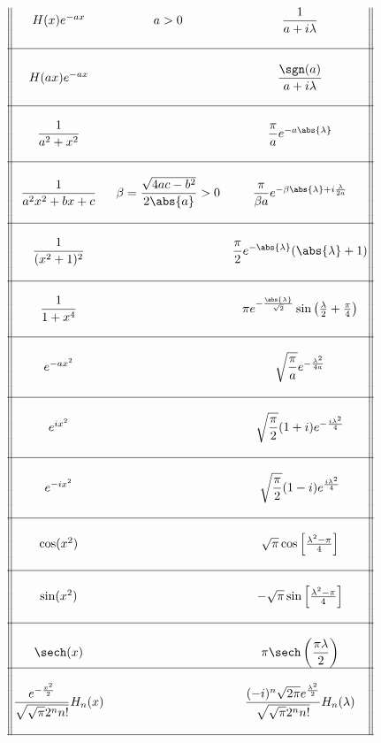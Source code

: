 \documentclass[../mmf.tex]{subfiles}
\begin{document}
\begin{center}
\begin{equation*}
\begin{Vmatrix}
		H(x)e^{-ax} & a>0 & \dfrac{1}{a+i\lambda}\\
		\\\hline\\
		H(ax)e^{-ax} && \dfrac{\sgn(a)}{a+i\lambda} \\
		\\\hline\\
		\dfrac{1}{a^2+x^2} && \dfrac{\pi}{a}e^{-a\abs{\lambda}} \\
		\\\hline\\
		\dfrac{1}{a^2x^2+bx+c} & \beta=\dfrac{\sqrt{4ac-b^2}}{2\abs{a}}>0 & \dfrac{\pi}{\beta a} e^{-\beta\abs{\lambda}+i\frac{\lambda}{2a}}  \\
		\\\hline\\
		\dfrac{1}{(x^2+1)^2} & & \dfrac{\pi}{2}e^{-\abs{\lambda}}(\abs{\lambda}+1) \\
		\\\hline\\
		\dfrac{1}{1+x^4}&& \pi e^{-\frac{\abs{\lambda}}{\sqrt{2}}}\sin\left(\frac{\lambda}{2}+\frac{\pi}{4}\right) \\
		\\\hline\\
		e^{-ax^2} && \sqrt{\dfrac{\pi}{a}}e^{-\frac{\lambda^2}{4a}} \\
		\\\hline\\
		e^{ix^2} && \sqrt{\dfrac{\pi}{2}}(1+i)e^{-\frac{i\lambda^2}{4}}\\
		\\\hline\\
		e^{-ix^2}&&\sqrt{\dfrac{\pi}{2}}(1-i)e^{\frac{i\lambda^2}{4}}\\
		\\\hline\\
		\cos(x^2) & &\sqrt{\pi}\cos\left[ \frac{\lambda^2-\pi}{4} \right] \\
		\\\hline\\
		\sin(x^2)  && -\sqrt{\pi}\sin\left[ \frac{\lambda^2-\pi}{4} \right] \\
		\\\hline\\
		\sech(x)&&\pi\sech\left( \dfrac{\pi\lambda}{2} \right)
		\\\hline\\
		\dfrac{e^{-\frac{x^2}{2}}}{\sqrt{\sqrt{\pi}2^nn!}}H_n(x) && \dfrac{(-i)^n\sqrt{2\pi}e^{\frac{\lambda^2}{2}}}{\sqrt{\sqrt{\pi}2^nn!}}H_n(\lambda) \\
		\\\hline
	\end{Vmatrix}
\end{equation*}
\end{center}
\end{document}
